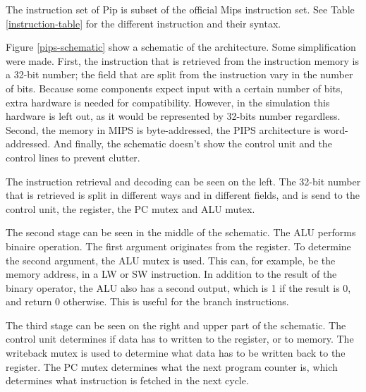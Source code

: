 \documentclass[a4paper,12pt]{article}
\begin{document}
The instruction set of Pip is subset of the official Mips instruction set.
See Table \ref{instruction-table} for the different instruction and their
syntax.

Figure \ref{pips-schematic} show a schematic of the architecture.
Some simplification were made. First, the instruction that is retrieved from
the instruction memory is a 32-bit number; the field that are split from the
instruction vary in the number of bits. Because some components expect input
with a certain number of bits, extra hardware is needed for compatibility.
However, in the simulation this hardware is left out, as it would be
represented by 32-bits number regardless. Second, the memory in MIPS is
byte-addressed, the PIPS architecture is word-addressed. And finally, the
schematic doesn't show the control unit and the control lines to prevent clutter.

The instruction retrieval and decoding can be seen on the left.
The 32-bit number that is retrieved is split in different
ways and in different fields, and is send to the control unit, the register,
the PC mutex and ALU mutex.

The second stage can be seen in the middle of the schematic. The ALU performs
binaire operation. The first argument originates from the register. To determine
the second argument, the ALU mutex is used. This can, for example, be
the memory address, in a LW or SW instruction. In addition to the result of the
binary operator, the ALU also has a second output, which is 1 if the result is
0, and return 0 otherwise. This is useful for the branch instructions.

The third stage can be seen on the right and upper part of the schematic.
The control unit determines if data has to written to the register, or to memory.
The writeback mutex is used to determine what data has to be written back to the
register. The PC mutex determines what the next program counter is, which
determines what instruction is fetched in the next cycle.
\end{document}
